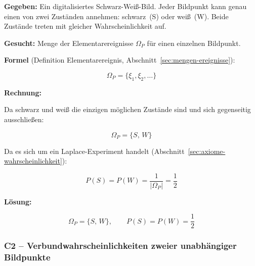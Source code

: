 \begin{beispiel}

\textbf{Gegeben:} Ein digitalisiertes Schwarz-Weiß-Bild. Jeder Bildpunkt kann genau
einen von zwei Zuständen annehmen: schwarz~(S) oder weiß~(W). Beide Zustände treten
mit gleicher Wahrscheinlichkeit auf.

\textbf{Gesucht:} Menge der Elementarereignisse $\Omega_P$ für einen einzelnen Bildpunkt.

\textbf{Formel} (Definition Elementarereignis, Abschnitt~\ref{sec:mengen-ereignisse}):

$$
\Omega_P = \{\xi_1, \xi_2, \ldots\}
$$

\textbf{Rechnung:}

Da schwarz und weiß die einzigen möglichen Zustände sind und sich gegenseitig ausschließen:

$$
\Omega_P = \{S,\, W\}
$$

Da es sich um ein Laplace-Experiment handelt (Abschnitt~\ref{sec:axiome-wahrscheinlichkeit}):

$$
P(S) = P(W) = \frac{1}{|\Omega_P|} = \frac{1}{2}
$$

\textbf{Lösung:}

$$
\boxed{\Omega_P = \{S,\, W\}, \qquad P(S) = P(W) = \frac{1}{2}}
$$

\end{beispiel}

\subsubsection*{C2 – Verbundwahrscheinlichkeiten zweier unabhängiger Bildpunkte}

